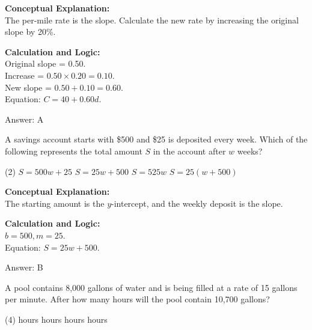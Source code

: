 \documentclass[11pt,paper=a4,answers]{exam}
\begin{document}
\begin{questions}
\begin{solution}
\textbf{Conceptual Explanation:} \\
The per-mile rate is the slope. Calculate the new rate by increasing the original slope by 20\%.

\vspace{10pt}
\textbf{Calculation and Logic:} \\
Original slope = 0.50. \\
Increase = $0.50 \times 0.20 = 0.10$. \\
New slope = $0.50 + 0.10 = 0.60$. \\
Equation: $C = 40 + 0.60d$.

\vspace{15pt}
Answer: \colorbox{yellow!100}{A}
\end{solution}

\vspace{20pt}

\question
A savings account starts with \$500 and \$25 is deposited every week. Which of the following represents the total amount $S$ in the account after $w$ weeks?
\begin{tasks}(2)
    \task $S = 500w + 25$
    \task $S = 25w + 500$
    \task $S = 525w$
    \task $S = 25(w + 500)$
\end{tasks}

\begin{solution}
\textbf{Conceptual Explanation:} \\
The starting amount is the $y$-intercept, and the weekly deposit is the slope.

\vspace{10pt}
\textbf{Calculation and Logic:} \\
$b = 500, m = 25$. \\
Equation: $S = 25w + 500$.

\vspace{15pt}
Answer: \colorbox{yellow!100}{B}
\end{solution}

\vspace{20pt}

\question
A pool contains 8,000 gallons of water and is being filled at a rate of 15 gallons per minute. After how many hours will the pool contain 10,700 gallons?
\begin{tasks}(4)
     hours
     hours
     hours
     hours
\end{tasks}


\end{questions}
\end{document}
